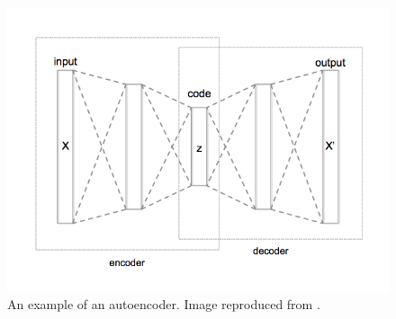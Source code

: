 




\begin{figure}[H]
\centering
\includegraphics[width=0.8\linewidth]{images/Autoencoder_structure}
\caption{An example of an autoencoder. Image reproduced from \cite{wiki:AutoencoderStructure}.}
\label{fig:Autoencoder_structure}
\end{figure}






